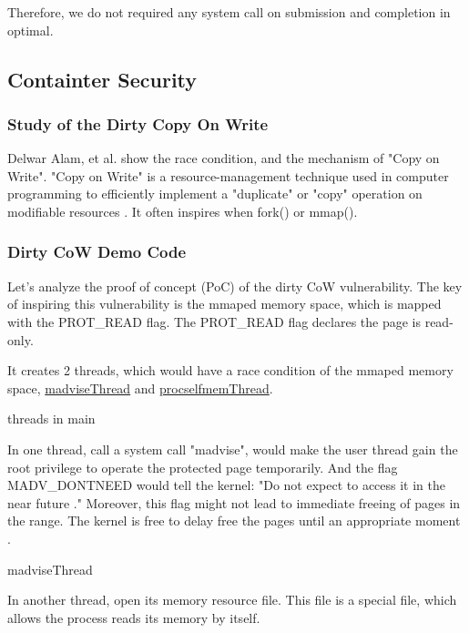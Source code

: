 \documentclass[12pt,a4paper]{article}
\begin{document}
Therefore, we do not required any system call on submission and completion in optimal.

\subsection{Containter Security}
\hypertarget{security}{}
\subsubsection{Study of the Dirty Copy On Write}
Delwar Alam, et al. \cite{Study_Dirty_Cow} show the race condition, and the mechanism of
"Copy on Write". "Copy on Write" is a resource-management technique used in
computer programming to efficiently implement a "duplicate" or "copy" operation
on modifiable resources \cite{CoW_wiki}. It often inspires when fork() or mmap().

\subsubsection{Dirty CoW Demo Code}
Let's analyze the proof of concept (PoC) of the dirty CoW \cite{Dirty_CoW} vulnerability.
The key of inspiring this vulnerability is the mmaped memory space, which is mapped with
the PROT\_READ flag. The PROT\_READ flag declares the page is read-only.


It creates 2 threads, which would have a race condition of the mmaped memory space,
\hyperlink{madvise}{madviseThread} and \hyperlink{procself}{procselfmemThread}.

\hypertarget{threads_main}{threads in main}


In one thread, call a system call "madvise", would make the user thread gain the root
privilege to operate the protected page temporarily. And the flag MADV\_DONTNEED would
tell the kernel: "Do not expect to access it in the near future \cite{Madvise}." Moreover,
this flag might not lead to immediate freeing of pages in the range. The kernel is free
to delay free the pages until an appropriate moment \cite{Madvise}.

\hypertarget{madvise}{madviseThread}


In another thread, open its memory resource file. This file is a special file, which allows
the process reads its memory by itself.\\
\end{document}
